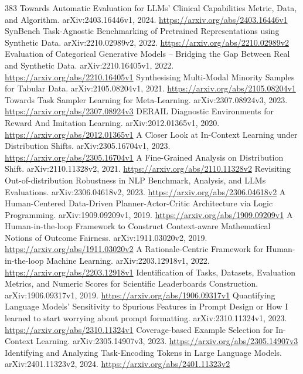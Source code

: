 \documentclass[11pt]{article}
\begin{document}
\begin{thebibliography}{383}
 Towards Automatic Evaluation for LLMs' Clinical Capabilities Metric, Data, and Algorithm. arXiv:2403.16446v1, 2024. \url{https://arxiv.org/abs/2403.16446v1}
 SynBench Task-Agnostic Benchmarking of Pretrained Representations using Synthetic Data. arXiv:2210.02989v2, 2022. \url{https://arxiv.org/abs/2210.02989v2}
 Evaluation of Categorical Generative Models -- Bridging the Gap Between Real and Synthetic Data. arXiv:2210.16405v1, 2022. \url{https://arxiv.org/abs/2210.16405v1}
 Synthesising Multi-Modal Minority Samples for Tabular Data. arXiv:2105.08204v1, 2021. \url{https://arxiv.org/abs/2105.08204v1}
 Towards Task Sampler Learning for Meta-Learning. arXiv:2307.08924v3, 2023. \url{https://arxiv.org/abs/2307.08924v3}
 DERAIL Diagnostic Environments for Reward And Imitation Learning. arXiv:2012.01365v1, 2020. \url{https://arxiv.org/abs/2012.01365v1}
 A Closer Look at In-Context Learning under Distribution Shifts. arXiv:2305.16704v1, 2023. \url{https://arxiv.org/abs/2305.16704v1}
 A Fine-Grained Analysis on Distribution Shift. arXiv:2110.11328v2, 2021. \url{https://arxiv.org/abs/2110.11328v2}
 Revisiting Out-of-distribution Robustness in NLP Benchmark, Analysis, and LLMs Evaluations. arXiv:2306.04618v2, 2023. \url{https://arxiv.org/abs/2306.04618v2}
 A Human-Centered Data-Driven Planner-Actor-Critic Architecture via Logic Programming. arXiv:1909.09209v1, 2019. \url{https://arxiv.org/abs/1909.09209v1}
 A Human-in-the-loop Framework to Construct Context-aware Mathematical Notions of Outcome Fairness. arXiv:1911.03020v2, 2019. \url{https://arxiv.org/abs/1911.03020v2}
 A Rationale-Centric Framework for Human-in-the-loop Machine Learning. arXiv:2203.12918v1, 2022. \url{https://arxiv.org/abs/2203.12918v1}
 Identification of Tasks, Datasets, Evaluation Metrics, and Numeric Scores for Scientific Leaderboards Construction. arXiv:1906.09317v1, 2019. \url{https://arxiv.org/abs/1906.09317v1}
 Quantifying Language Models' Sensitivity to Spurious Features in Prompt Design or How I learned to start worrying about prompt formatting. arXiv:2310.11324v1, 2023. \url{https://arxiv.org/abs/2310.11324v1}
 Coverage-based Example Selection for In-Context Learning. arXiv:2305.14907v3, 2023. \url{https://arxiv.org/abs/2305.14907v3}
 Identifying and Analyzing Task-Encoding Tokens in Large Language Models. arXiv:2401.11323v2, 2024. \url{https://arxiv.org/abs/2401.11323v2}

\end{thebibliography}
\end{document}
